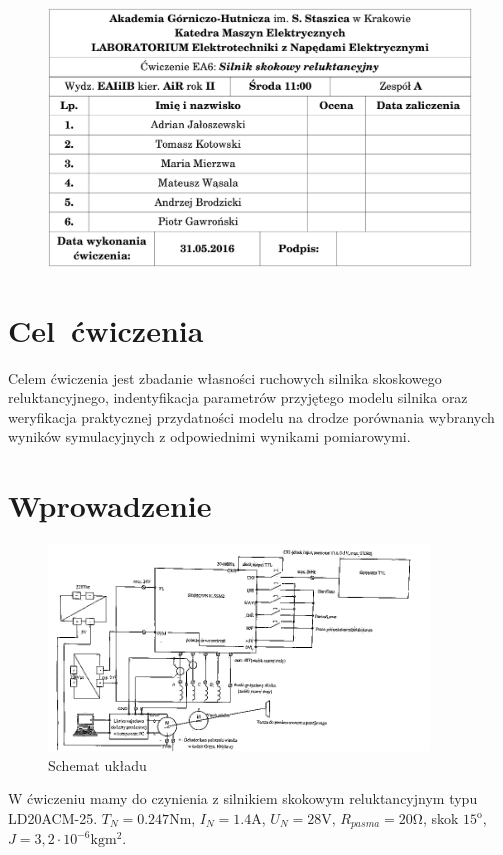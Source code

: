 \documentclass[a4paper, 12pt]{article}
\begin{document}
	\begin{figure}[H]
		\centering
		\includegraphics[width = \textwidth]{./img/cudo.png}
	\end{figure}
	\section{Cel ćwiczenia}
		Celem ćwiczenia jest zbadanie własności ruchowych silnika skoskowego reluktancyjnego, indentyfikacja parametrów przyjętego modelu silnika oraz weryfikacja praktycznej przydatności modelu na drodze porównania wybranych wyników symulacyjnych z odpowiednimi wynikami pomiarowymi.
	\section{Wprowadzenie}
		\begin{figure}[H]
			\centering
			\includegraphics[width = 0.9\textwidth]{./img/schemat.png}
			\caption{Schemat układu}
		\end{figure} \noindent
		W ćwiczeniu mamy do czynienia z silnikiem skokowym reluktancyjnym typu LD20ACM-25. $T_N = 0.247 \mathrm{Nm}$, $I_N = 1.4 \mathrm{A}$, $U_N = 28 \mathrm{V}$, $R_{pasma} = 20 \mathrm{\Omega}$, skok $15^\mathrm{o}$, $J = 3,2\cdot10^{-6}\mathrm{kgm^2}$.
\end{document}
